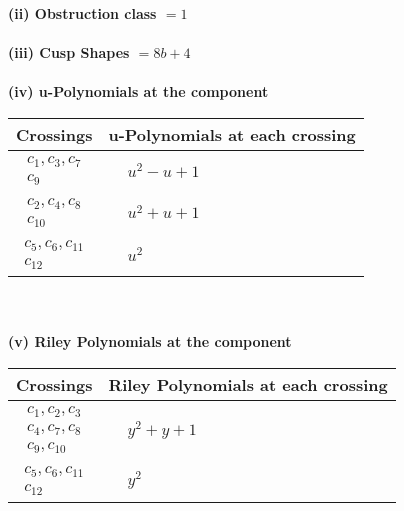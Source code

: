 \documentclass[1p]{elsarticle_modified}
\theoremstyle{definition}
\begin{document}
\flushleft \textbf{(ii) Obstruction class $= 1$}\\~\\
\flushleft \textbf{(iii) Cusp Shapes $= 8 b+4$}\\~\\
\newpage\renewcommand{\arraystretch}{1}
\flushleft \textbf{(iv) u-Polynomials at the component}\newline \\
\begin{tabular}{m{50pt}|m{274pt}}
Crossings & \hspace{64pt}u-Polynomials at each crossing \\
\hline $$\begin{aligned}c_{1},c_{3},c_{7}\\c_{9}\end{aligned}$$&$\begin{aligned}
&u^2- u+1
\end{aligned}$\\
\hline $$\begin{aligned}c_{2},c_{4},c_{8}\\c_{10}\end{aligned}$$&$\begin{aligned}
&u^2+u+1
\end{aligned}$\\
\hline $$\begin{aligned}c_{5},c_{6},c_{11}\\c_{12}\end{aligned}$$&$\begin{aligned}
&u^2
\end{aligned}$\\
\hline
\end{tabular}\\~\\
\newpage\renewcommand{\arraystretch}{1}
\flushleft \textbf{(v) Riley Polynomials at the component}\newline \\
\begin{tabular}{m{50pt}|m{274pt}}
Crossings & \hspace{64pt}Riley Polynomials at each crossing \\
\hline $$\begin{aligned}c_{1},c_{2},c_{3}\\c_{4},c_{7},c_{8}\\c_{9},c_{10}\end{aligned}$$&$\begin{aligned}
&y^2+y+1
\end{aligned}$\\
\hline $$\begin{aligned}c_{5},c_{6},c_{11}\\c_{12}\end{aligned}$$&$\begin{aligned}
&y^2
\end{aligned}$\\
\hline
\end{tabular}\\~\\
\end{document}
